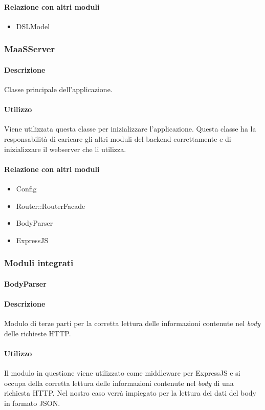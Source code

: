 \paragraph*{Relazione con altri moduli}
\begin{itemize}
\item DSLModel
\end{itemize}

\subsubsection{MaaSServer}
\paragraph*{Descrizione}
Classe principale dell'applicazione.

\paragraph*{Utilizzo}
Viene utilizzata questa classe per inizializzare l'applicazione. Questa classe ha la responsabilità di caricare gli altri moduli del backend correttamente e di inizializzare il webserver che li utilizza.
\paragraph*{Relazione con altri moduli}
\begin{itemize}
\item Config
\item Router::RouterFacade
\item BodyParser
\item ExpressJS
\end{itemize}


\subsubsection{Moduli integrati}
\paragraph{BodyParser}
\paragraph*{Descrizione}
Modulo di terze parti per la corretta lettura delle informazioni contenute nel \textit{body} delle richieste HTTP.

\paragraph*{Utilizzo}
Il modulo in questione viene utilizzato come middleware per ExpressJS e si occupa della corretta lettura delle informazioni contenute nel \textit{body} di una richiesta HTTP. Nel nostro caso verrà impiegato per la lettura dei dati del body in formato JSON.

